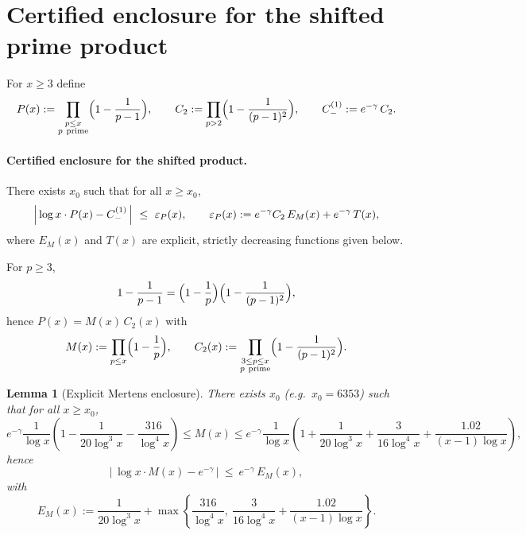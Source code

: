 \documentclass[11pt]{article}
\theoremstyle{inline}
\theoremstyle{break}
\newtheorem{lemma}{Lemma}
\theoremstyle{break}
\theoremstyle{break}
\theoremstyle{break}
\theoremstyle{break}
\theoremstyle{break}
\theoremstyle{break}
\theoremstyle{inline}
\newcommand{\xMertens}{6353} %
\begin{document}

\appendix
\section{Certified enclosure for the shifted prime product}
\label{app:shifted-product}

For \( x\ge 3 \) define
\begin{equation}
P(x) := \prod_{\substack{p\le x\\ p\ \text{prime}}}\Bigl(1-\frac{1}{p-1}\Bigr),
\qquad
C_2 := \prod_{p>2}\Bigl(1-\frac{1}{(p-1)^2}\Bigr),
\qquad
C_-^{(1)} := e^{-\gamma}\,C_2 .
\end{equation}

\paragraph{Certified enclosure for the shifted product.}\label{thm:shifted-enclosure}
There exists \( x_0 \) such that for all \( x\ge x_0 \),
\begin{equation}
\Bigl|\,\log x\cdot P(x) - C_-^{(1)}\,\Bigr|
\ \le\
\varepsilon_P(x),
\qquad
\varepsilon_P(x) := e^{-\gamma}C_2\,E_M(x) + e^{-\gamma}\,T(x),
\end{equation}
where \( E_M(x) \) and \( T(x) \) are explicit, strictly decreasing functions given below.

\medskip
For \( p\ge 3 \),
\begin{equation}
1-\frac{1}{p-1}=\Bigl(1-\frac{1}{p}\Bigr)\Bigl(1-\frac{1}{(p-1)^2}\Bigr),
\end{equation}
hence \( P(x)=M(x)\,C_2(x) \) with
\begin{equation}
M(x):=\prod_{p\le x}\Bigl(1-\frac{1}{p}\Bigr),\qquad
C_2(x):=\prod_{\substack{3\le p\le x\\ p\ \text{prime}}}\Bigl(1-\frac{1}{(p-1)^2}\Bigr).
\end{equation}

\begin{lemma}[Explicit Mertens enclosure\cite{RosserSchoenfeld1962, Dusart2010}]\label{lem:explicit-mertens}
There exists \( x_0 \) (e.g.\ \( x_0=\xMertens \)) such that for all \( x\ge x_0 \),
\begin{equation}
e^{-\gamma}\frac{1}{\log x}\!\left(1-\frac{1}{20\log^3 x}-\frac{316}{\log^4 x}\right)
\le M(x) \le
e^{-\gamma}\frac{1}{\log x}\!\left(1+\frac{1}{20\log^3 x}+\frac{3}{16\log^4 x}
+\frac{1.02}{(x-1)\log x}\right),
\end{equation}
hence
\begin{equation}
\bigl|\,\log x\cdot M(x)-e^{-\gamma}\,\bigr|\ \le\ e^{-\gamma}\,E_M(x),
\end{equation}
with
\begin{equation}
E_M(x) := \frac{1}{20\log^3 x}+\max\!\left\{\frac{316}{\log^4 x},\ \frac{3}{16\log^4 x}+\frac{1.02}{(x-1)\log x}\right\}.
\end{equation}
\end{lemma}
\end{document}
